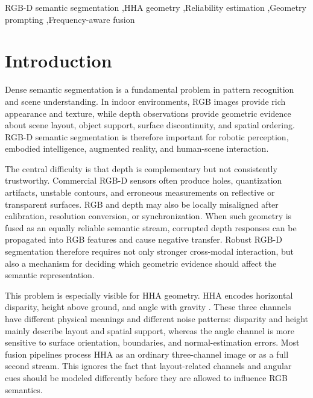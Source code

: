 \documentclass[a4paper,fleqn]{cas-dc}
\begin{document}

\begin{keywords}
RGB-D semantic segmentation \sep HHA geometry \sep Reliability estimation \sep Geometry prompting \sep Frequency-aware fusion
\end{keywords}

\maketitle

\section{Introduction}\label{sec:introduction}

Dense semantic segmentation is a fundamental problem in pattern recognition and scene understanding. In indoor environments, RGB images provide rich appearance and texture, while depth observations provide geometric evidence about scene layout, object support, surface discontinuity, and spatial ordering. RGB-D semantic segmentation is therefore important for robotic perception, embodied intelligence, augmented reality, and human-scene interaction.

The central difficulty is that depth is complementary but not consistently trustworthy. Commercial RGB-D sensors often produce holes, quantization artifacts, unstable contours, and erroneous measurements on reflective or transparent surfaces. RGB and depth may also be locally misaligned after calibration, resolution conversion, or synchronization. When such geometry is fused as an equally reliable semantic stream, corrupted depth responses can be propagated into RGB features and cause negative transfer. Robust RGB-D segmentation therefore requires not only stronger cross-modal interaction, but also a mechanism for deciding which geometric evidence should affect the semantic representation.

This problem is especially visible for HHA geometry. HHA encodes horizontal disparity, height above ground, and angle with gravity \citep{gupta2014hha}. These three channels have different physical meanings and different noise patterns: disparity and height mainly describe layout and spatial support, whereas the angle channel is more sensitive to surface orientation, boundaries, and normal-estimation errors. Most fusion pipelines process HHA as an ordinary three-channel image or as a full second stream. This ignores the fact that layout-related channels and angular cues should be modeled differently before they are allowed to influence RGB semantics.
\end{document}
